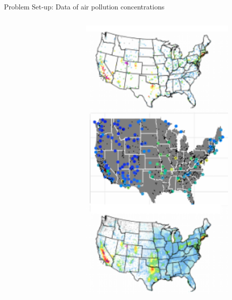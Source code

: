 \documentclass{beamer}
\begin{document}
\begin{frame}{Problem Set-up: Data of air pollution concentrations}
\begin{columns}
\begin{column}{6cm}
\end{column}
\begin{column}{5cm}
\vspace{-5mm}
\begin{center}
\includegraphics[width=0.85\textwidth]{DataSources.png}
\end{center}

\end{column}
\end{columns}

\end{frame}
\end{document}
